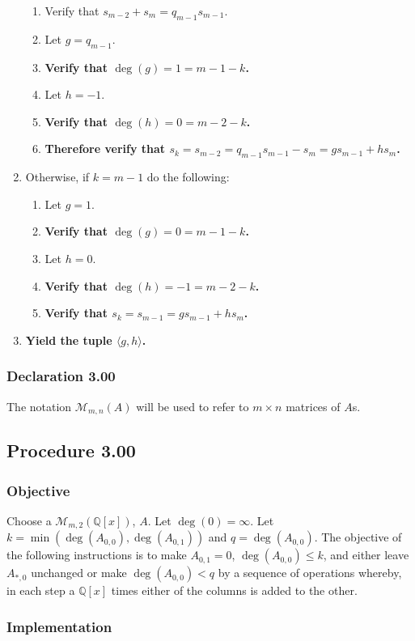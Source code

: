 \documentclass[twocolumn]{article}
\newcommand{\declaration}[1]{\subsubsection*{Declaration #1}\label{sec:declaration #1}}
\newcommand{\procedure}[2][]{\subsection*{Procedure #2 \ifthenelse{\equal{#1}{}}{}{(#1)}}\label{sec:procedure #2}}
\newcommand{\objective}{\subsubsection*{Objective}}
\newcommand{\implementation}{\subsubsection*{Implementation}}
\begin{document}
\begin{enumerate}
					\begin{enumerate}
						\item Verify that $s_{m-2}+s_m=q_{m-1}s_{m-1}$.
						\item Let $g=q_{m-1}$.
						\item \textbf{Verify that $\deg(g)=1=m-1-k$.}
						\item Let $h=-1$.
						\item \textbf{Verify that $\deg(h)=0=m-2-k$.}
						\item \textbf{Therefore verify that $s_k=s_{m-2}=q_{m-1}s_{m-1}-s_m=gs_{m-1}+hs_m$.}
					\end{enumerate}
					\item Otherwise, if $k=m-1$ do the following:
					\begin{enumerate}
						\item Let $g=1$.
						\item \textbf{Verify that $\deg(g)=0=m-1-k$.}
						\item Let $h=0$.
						\item \textbf{Verify that $\deg(h)=-1=m-2-k$.}
						\item \textbf{Verify that $s_k=s_{m-1}=gs_{m-1}+hs_m$.}
					\end{enumerate}
					\item \textbf{Yield the tuple $\langle g,h\rangle$.}
				\end{enumerate}
		\declaration{3.00}
			The notation $\mathcal{M}_{m,n}(A)$ will be used to refer to $m\times n$ matrices of $A$s.
		\procedure{3.00}
			\objective
				Choose a $\mathcal{M}_{m,2}(\mathbb{Q}[x])$, $A$. Let $\deg(0)=\infty$. Let $k=\min(\deg(A_{0,0}),\deg(A_{0,1}))$ and $q=\deg(A_{0,0})$. The objective of the following instructions is to make $A_{0,1}=0$, $\deg(A_{0,0})\le k$, and either leave $A_{*,0}$ unchanged or make $\deg(A_{0,0})<q$ by a sequence of operations whereby, in each step a $\mathbb{Q}[x]$ times either of the columns is added to the other.
			\implementation
\end{document}
